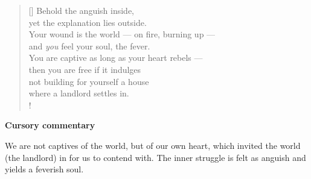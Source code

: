 \documentclass[a4paper,12pt,twoside,final]{book}
\begin{document}
\newpage


\settowidth{\versewidth}{Your wound is the world --- on fire, burning up ---}

\begin{verse}[\versewidth]
  Behold the anguish inside, \\
  yet the explanation lies outside. \\
  Your wound is the world --- on fire, burning up --- \\
  and \emph{you} feel your soul, the fever. \\
  You are captive as long as your heart rebels --- \\
  then you are free if it indulges \\
  not building for yourself a house \\
  where a landlord settles in. \\!
\end{verse}


\bigskip

\noindent \textbf{Cursory commentary}

\medskip

We are not captives of the world, but of our own heart, which invited
the world (the landlord) in for us to contend with. The inner struggle
is felt as anguish and yields a feverish soul.

\newpage

\settowidth{\versewidth}{nem raksz magadnak olyan házat,}
\end{document}
